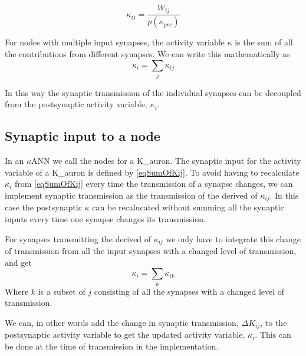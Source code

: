 			\begin{equation}
				\label{eqSynapticTransmissionForKANN}
				\kappa_{ij} = \frac{ W_{ij} }{ p(\kappa_{pre})}
			\end{equation}

			For nodes with multiple input synapses, the activity variable $\kappa$ is the sum of all the contributions from different synapses. %
			We can write this mathematically as 
			\begin{equation}
				\label{eqSumOfKij}
				\kappa_i = \sum_j{\kappa_{ij}}
			\end{equation}

			In this way the synaptic transmission of the individual synapses can be decoupled from the postsynaptic activity variable, $\kappa_i$.
			
		\subsection{Synaptic input to a node}
			In an $\kappa$ANN we call the nodes for a K\_auron.
			The synaptic input for the activity variable of a K\_auron is defined by \eqref{eqSumOfKij}.
			To avoid having to recalculate $\kappa_i$ from \eqref{eqSumOfKij} every time the transmission of a synapse changes, we can implement synaptic transmission as the transmission of the derived of $\kappa_{ij}$.
			In this case the postsynaptic $\kappa$ can be recalucated without summing all the synaptic inputs every time one synapse changes its transmission.

			For synapses transmitting the derived of $\kappa_{ij}$ we only have to integrate this change of transmission from all the input synapses with a changed level of transmission, and get
			\begin{equation}
				\kappa_i = \sum_k{\kappa_{ik}}
			\end{equation}
			Where ${k}$ is a subset of ${j}$ consisting of all the synapses with a changed level of transmission.

			We can, in other words add the change in synaptic transmission, $\Delta K_{ij}$, to the postsynaptic activity variable to get the updated activity variable, $\kappa_i$.
			This can be done at the time of transmission in the implementation.

